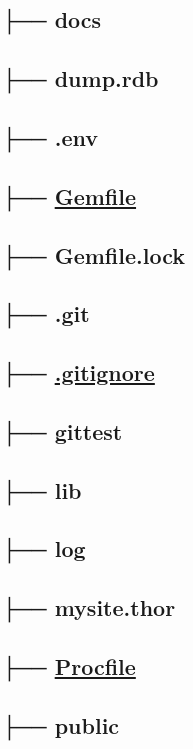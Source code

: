 \documentclass[11pt]{article}
\begin{document}
\subsection*{├── docs}
\label{sec-1-8}
\subsection*{├── dump.rdb}
\label{sec-1-9}
\subsection*{├── .env}
\label{sec-1-10}
\subsection*{├── \href{./Gemfile}{Gemfile}}
\label{sec-1-11}
\subsection*{├── Gemfile.lock}
\label{sec-1-12}
\subsection*{├── .git}
\label{sec-1-13}
\subsection*{├── \href{./.gitignore}{.gitignore}}
\label{sec-1-14}
\subsection*{├── gittest}
\label{sec-1-15}
\subsection*{├── lib}
\label{sec-1-16}
\subsection*{├── log}
\label{sec-1-17}
\subsection*{├── mysite.thor}
\label{sec-1-18}
\subsection*{├── \href{./Procfile}{Procfile}}
\label{sec-1-19}
\subsection*{├── public}
\label{sec-1-20}
\end{document}
